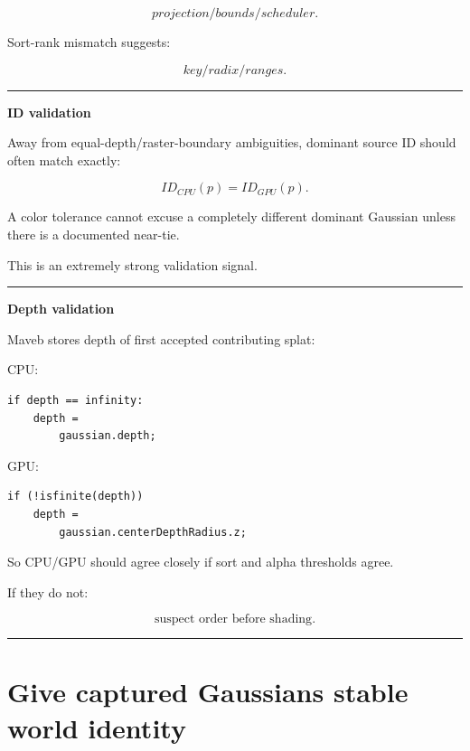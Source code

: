 \[
projection/bounds/scheduler.
\]

Sort-rank mismatch suggests:

\[
key/radix/ranges.
\]

\begin{center}\rule{0.5\linewidth}{0.5pt}\end{center}

\textbf{ID validation}

Away from equal-depth/raster-boundary ambiguities, dominant source ID should often match exactly:

\[
\boxed{
ID_{CPU}(p)=ID_{GPU}(p).
}
\]

A color tolerance cannot excuse a completely different dominant Gaussian unless there is a documented near-tie.

This is an extremely strong validation signal.

\begin{center}\rule{0.5\linewidth}{0.5pt}\end{center}

\textbf{Depth validation}

Maveb stores depth of first accepted contributing splat:

CPU:

\begin{verbatim}
if depth == infinity:
    depth =
        gaussian.depth;
\end{verbatim}

GPU:

\begin{verbatim}
if (!isfinite(depth))
    depth =
        gaussian.centerDepthRadius.z;
\end{verbatim}

So CPU/GPU should agree closely if sort and alpha thresholds agree.

If they do not:

\[
\boxed{
\text{suspect order before shading}.
}
\]

\begin{center}\rule{0.5\linewidth}{0.5pt}\end{center}

\section{Give captured Gaussians stable world identity}\label{04-visual-computing-ii-ch039-give-captured-gaussians-stable-world-identity}

\hypertarget{04-visual-computing-ii-ch039-give-captured-gaussians-stable-world-identity}{}

